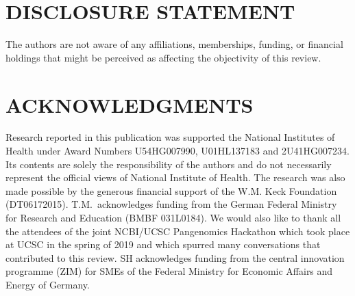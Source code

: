 
\section*{DISCLOSURE STATEMENT}
The authors are not aware of any affiliations, memberships, funding, or financial holdings that
might be perceived as affecting the objectivity of this review. 

\section*{ACKNOWLEDGMENTS}
Research reported in this publication was supported the National Institutes of Health under Award Numbers U54HG007990, U01HL137183 and 2U41HG007234. Its contents are solely the responsibility of the authors and do not necessarily represent the official views of National Institute of Health. The research was also made possible by the generous financial support of the W.M. Keck Foundation (DT06172015). T.M.\ acknowledges funding from the German Federal Ministry for Research and Education (BMBF 031L0184). We would also like to thank all the attendees of the joint NCBI/UCSC Pangenomics Hackathon which took place at UCSC in the spring of 2019 and which spurred many conversations that contributed to this review. SH acknowledges funding from the central innovation programme (ZIM) for SMEs of the Federal Ministry for Economic Affairs and Energy of Germany.
